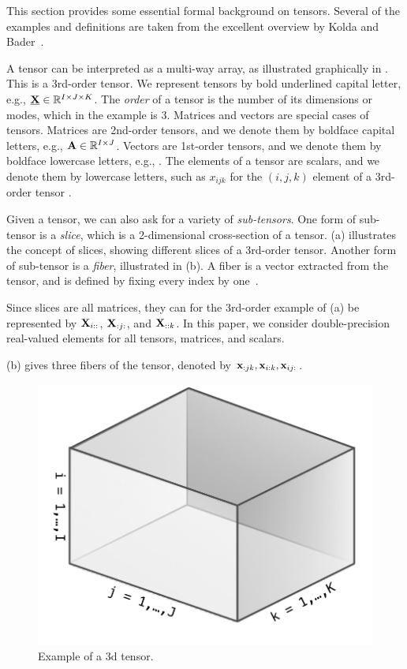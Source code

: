 This section provides some essential formal background on tensors. Several of the examples and definitions are taken from the excellent overview by Kolda and Bader~\cite{Kolda:2009}.

A tensor can be interpreted as a multi-way array, as illustrated graphically in . This is a 3rd-order tensor. 
We represent tensors by bold underlined capital letter, e.g., $\T{X} \in \R^{I \times J \times K}$. 
The \emph{order} of a tensor is the number of its dimensions or modes, which in the example is 3.
Matrices and vectors are special cases of tensors.
Matrices are 2nd-order tensors, and we denote them by boldface capital letters, e.g., $\M{A} \in \R^{I \times J}$.
Vectors are 1st-order tensors, and we denote them by boldface lowercase letters, e.g., .
The elements of a tensor are scalars, and we denote them by lowercase letters, such as $x_{ijk}$ for the $(i,j,k)$ element of a 3rd-order tensor .

Given a tensor, we can also ask for a variety of \emph{sub-tensors}.
One form of sub-tensor is a \emph{slice}, which is a 2-dimensional cross-section of a tensor.
(a) illustrates the concept of slices, showing different slices of a 3rd-order tensor.
Another form of sub-tensor is a \emph{fiber}, illustrated in (b).
A fiber is a vector extracted from the tensor, and is defined by fixing every index by one~\cite{Kolda:2009}.

Since slices are all matrices, they can for the 3rd-order example of (a) be represented by $\M{X}_{i::}$, $\M{X}_{:j:}$, and $\M{X}_{::k}$.
In this paper, we consider double-precision real-valued elements for all tensors, matrices, and scalars.

(b) gives three fibers of the tensor, denoted by $\V{x}_{:jk}, \V{x}_{i:k}, \V{x}_{ij:}$.

\begin{figure}
  \centering\includegraphics[width=0.4\linewidth]{figs/3dtensor}
  \caption{Example of a 3d tensor.}
  \label{fig:3dtensor}
\end{figure}

